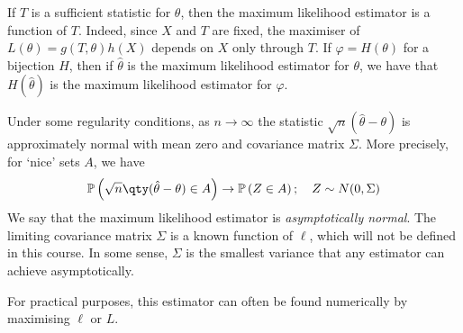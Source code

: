 \begin{remark}
	If $T$ is a sufficient statistic for $\theta$, then the maximum likelihood estimator is a function of $T$.
	Indeed, since $X$ and $T$ are fixed, the maximiser of $L(\theta) = g(T,\theta) h(X)$ depends on $X$ only through $T$.
	If $\varphi = H(\theta)$ for a bijection $H$, then if $\hat \theta$ is the maximum likelihood estimator for $\theta$, we have that $H(\hat \theta)$ is the maximum likelihood estimator for $\varphi$.

	Under some regularity conditions, as $n \to \infty$ the statistic $\sqrt{n} (\hat \theta - \theta)$ is approximately normal with mean zero and covariance matrix $\Sigma$.
	More precisely, for `nice' sets $A$, we have
	\begin{align*}
		\prob{\sqrt{n} \qty(\hat \theta - \theta) \in A} \to \prob{Z \in A};\quad Z \sim N(0, \Sigma)
	\end{align*}
	We say that the maximum likelihood estimator is \textit{asymptotically normal}.
	The limiting covariance matrix $\Sigma$ is a known function of $\ell$, which will not be defined in this course.
	In some sense, $\Sigma$ is the smallest variance that any estimator can achieve asymptotically.

	For practical purposes, this estimator can often be found numerically by maximising $\ell$ or $L$.
\end{remark}
